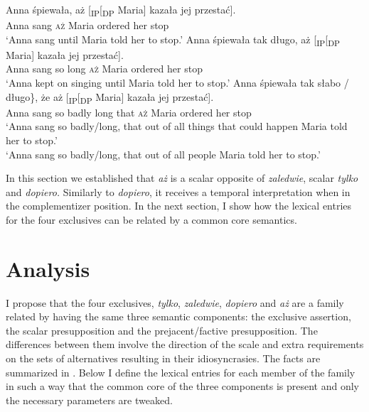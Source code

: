 \documentclass[output=paper,colorlinks,citecolor=brown]{langscibook}
\begin{document}
\ea\label{ex:tom:74}
\ea\label{ex:tom:74a} 
\gll Anna śpiewała, aż  [\textsubscript{IP}[\textsubscript{DP} Maria] kazała jej przestać]. \\ 
Anna sang \textsc{aż} {} Maria ordered her stop\\
\glt `Anna sang until Maria told her to stop.’
\ex\label{ex:tom:74b}       
\gll Anna śpiewała tak długo, aż  [\textsubscript{IP}[\textsubscript{DP} Maria] kazała jej przestać]. \\ 
Anna sang so long \textsc{aż} {} Maria ordered her stop\\
\glt `Anna kept on singing until Maria told her to stop.’
\ex\label{ex:tom:74c}       
\gll Anna śpiewała tak \minsp{\{} słabo / długo\}, że aż [\textsubscript{IP}[\textsubscript{DP} Maria] kazała jej przestać]. \\ 
Anna sang so {} badly {} long that \textsc{aż} {} Maria ordered her stop\\
\ea `Anna sang so badly/long, that out of all things that could happen Maria told her to stop.’\\
\ex `Anna sang so badly/long, that out of all people Maria told her to stop.’
\z 
\z 
\z 

\noindent In this section we established that \textit{aż} is a scalar opposite of \textit{zaledwie}, scalar \textit{tylko} and \textit{dopiero.} Similarly to \textit{dopiero}, it receives a temporal interpretation when in the complementizer position. In the next section, I show how the lexical entries for the four exclusives can be related by a common core semantics.

\section{Analysis}
\label{sec:tom:5}

I propose that the four exclusives, \textit{tylko}, \textit{zaledwie}, \textit{dopiero} and \textit{aż} are a family related by having the same three semantic components: the exclusive assertion, the scalar presupposition and the prejacent/factive presupposition. The differences between them involve the direction of the scale and extra requirements on the sets of alternatives resulting in their idiosyncrasies. The facts are summarized in . Below I define the lexical entries for each member of the family in such a way that the common core of the three components is present and only the necessary parameters are tweaked.
\end{document}
